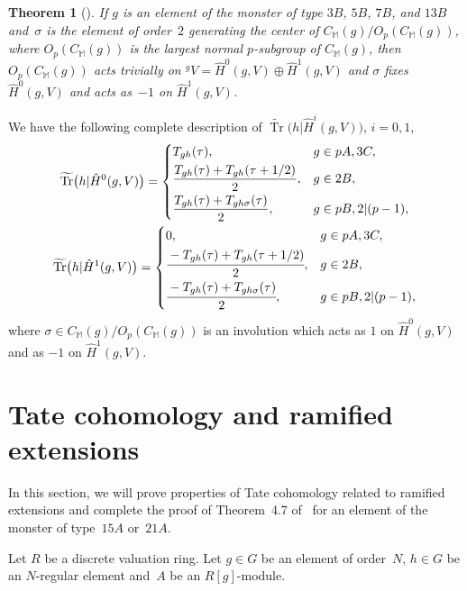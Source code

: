 \documentclass[pdftex]{sigma}%
\numberwithin{equation}{section}
\newtheorem{Theorem}{Theorem}[section]
\begin{document}
\begin{Theorem}[{\cite[Theorem 6.1]{B98}}]
If $g$ is an element of the monster of type $3B$, $5B$, $7B$, and $13B$ and~$\sigma$ is the element of order~$2$ generating the center of $C_\mathbb{M}(g)/O_p(C_\mathbb{M}(g))$, where $O_p(C_\mathbb{M}(g))$ is the largest normal $p$-subgroup of $C_\mathbb{M}(g)$, then $O_p(C_\mathbb{M}(g))$ acts trivially on $^gV=\hat{H}^0(g,V)\oplus \hat{H}^1(g,V)$ and $\sigma$ fixes $\hat{H}^0(g,V)$ and acts as~$-1$ on $\hat{H}^1(g,V)$.
\end{Theorem}

We have the following complete description of $\widetilde{\operatorname{Tr}}\big(h|{\hat{H}}^i(g,V)\big)$, $i=0,1$,
\begin{gather*}
\widetilde{\operatorname{Tr}}\big(h|{\hat{H}}^0(g,V)\big)= \begin{cases}
T_{gh}(\tau), & g \in pA,3C,\vspace{1mm}\\
\dfrac{T_{gh}(\tau)+T_{gh}(\tau +1/2)}{2}, & g \in 2B, \vspace{1mm}\\
\dfrac{T_{gh}(\tau)+T_{gh\sigma}(\tau)}{2}, & g \in pB,2|(p-1),
\end{cases}
\\
 \widetilde{\operatorname{Tr}}\big(h|{\hat{H}}^1(g,V)\big)= \begin{cases}
0, & g \in pA,3C,\vspace{1mm}\\
\cfrac{-T_{gh}(\tau)+T_{gh}(\tau +1/2)}{2}, & g \in 2B, \vspace{1mm}\\
\cfrac{-T_{gh}(\tau)+T_{gh\sigma}(\tau)}{2}, & g \in pB,2|(p-1),
\end{cases}
\end{gather*}
where $\sigma \in C_{\mathbb{M}}(g)/O_p(C_{\mathbb{M}}(g))$ is an involution which acts as $1$ on $\hat{H}^0(g,V)$ and as $-1$ on $\hat{H}^1(g,V)$.

\section{Tate cohomology and ramified extensions}\label{section4}

In this section, we will prove properties of Tate cohomology related to ramified extensions and complete the proof of Theorem~4.7 of~\cite{BR} for an element of the monster of type~$15A $ or~$21A$.

Let $R$ be a discrete valuation ring. Let $g \in G$ be an element of order~$N$, $h \in G$ be an $N$-regular element and~$A$ be an $R[g]$-module.
\end{document}
